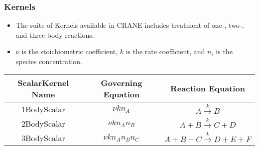 	\begin{frame}[fragile]
		\frametitle{Kernels}
		\begin{itemize}
			\item The suite of Kernels available in CRANE includes treatment of one-, two-, and three-body reactions.
			\item $\nu$ is the stoichiometric coefficient, $k$ is the rate coefficient, and $n_i$ is the species concentration.
		\end{itemize}
		\resizebox{\linewidth}{!}
		{
		\begin{tabular}{| c | c | c |}
		\hline
		\textbf{ScalarKernel Name} & \textbf{Governing Equation} & \textbf{Reaction Equation} \\
		\hline
		[Product/Reactant]1BodyScalar & $\nu k n_A$ & $A \xrightarrow{k} B$ \\
		\hline
		[Product/Reactant]2BodyScalar & $\nu k n_A n_B$ & $A + B \xrightarrow{k} C + D$\\
		\hline
		[Product/Reactant]3BodyScalar & $\nu k n_A n_B n_C$ & $A + B + C \xrightarrow{k} D + E + F$ \\
		\hline
	\end{tabular}
	}
	\end{frame}
	
	